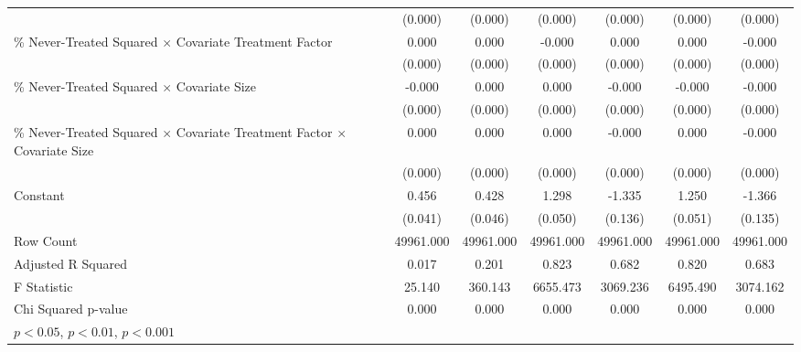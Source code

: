 \begin{table}[htbp]
\begin{tabular}{l*{6}{c}}
                    &     (0.000)         &     (0.000)         &     (0.000)         &     (0.000)         &     (0.000)         &     (0.000)         \\
\% Never-Treated Squared $\times$ Covariate Treatment Factor&       0.000\sym{***}&       0.000         &      -0.000         &       0.000         &       0.000\sym{***}&      -0.000         \\
                    &     (0.000)         &     (0.000)         &     (0.000)         &     (0.000)         &     (0.000)         &     (0.000)         \\
\% Never-Treated Squared $\times$ Covariate Size&      -0.000         &       0.000         &       0.000         &      -0.000\sym{*}  &      -0.000         &      -0.000\sym{*}  \\
                    &     (0.000)         &     (0.000)         &     (0.000)         &     (0.000)         &     (0.000)         &     (0.000)         \\
\% Never-Treated Squared $\times$ Covariate Treatment Factor $\times$ Covariate Size&       0.000\sym{***}&       0.000\sym{*}  &       0.000         &      -0.000         &       0.000         &      -0.000\sym{**} \\
                    &     (0.000)         &     (0.000)         &     (0.000)         &     (0.000)         &     (0.000)         &     (0.000)         \\
Constant            &       0.456\sym{***}&       0.428\sym{***}&       1.298\sym{***}&      -1.335\sym{***}&       1.250\sym{***}&      -1.366\sym{***}\\
                    &     (0.041)         &     (0.046)         &     (0.050)         &     (0.136)         &     (0.051)         &     (0.135)         \\
\hline
Row Count           &   49961.000         &   49961.000         &   49961.000         &   49961.000         &   49961.000         &   49961.000         \\
Adjusted R Squared  &       0.017         &       0.201         &       0.823         &       0.682         &       0.820         &       0.683         \\
F Statistic         &      25.140         &     360.143         &    6655.473         &    3069.236         &    6495.490         &    3074.162         \\
Chi Squared p-value &       0.000         &       0.000         &       0.000         &       0.000         &       0.000         &       0.000         \\
\hline\hline
\multicolumn{7}{l}{\footnotesize \sym{*} \(p<0.05\), \sym{**} \(p<0.01\), \sym{***} \(p<0.001\)}\\
\end{tabular}
\end{table}
